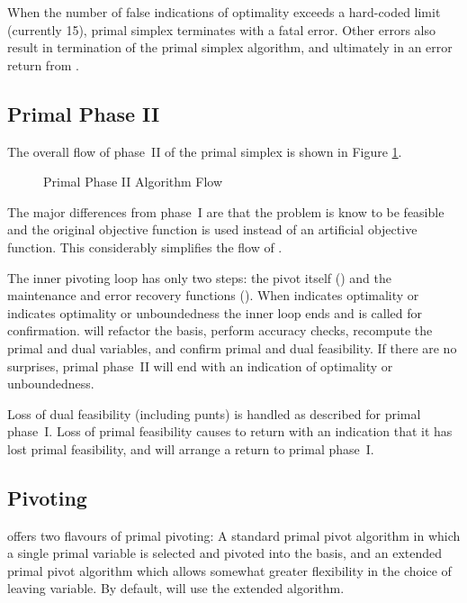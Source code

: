 When the number of false indications of optimality exceeds a hard-coded limit
(currently 15), primal simplex terminates with a fatal error.
Other errors also result in termination of the primal simplex algorithm, and
ultimately in an error return from \dylp.

\subsection{Primal Phase II}
\label{sec:PrimalPhaseII}

The overall flow of phase~II of the primal simplex is shown in Figure
\ref{fig:PrimalPhaseIIFlow}.
\begin{figure}[htbp]
\centering
{}
\caption{Primal Phase II Algorithm Flow} \label{fig:PrimalPhaseIIFlow}
\end{figure}
The major differences from phase~I are that the problem is know to be feasible
and the original objective function is used instead of an artificial
objective function.
This considerably simplifies the flow of .

The inner pivoting loop has only two steps: the pivot itself
() and the maintenance and error recovery functions
().
When  indicates optimality or
 indicates optimality or unboundedness
the inner loop ends and
 is called for confirmation.
 will refactor the basis, perform accuracy checks,
recompute the primal and dual variables, and confirm primal and dual
feasibility.
If there are no surprises, primal phase~II will end with an indication of
optimality or unboundedness.

Loss of dual feasibility (including punts) is handled as described for primal
phase~I.
Loss of primal feasibility causes  to return with an indication
that it has lost primal feasibility, and  will arrange a
return to primal phase~I\@.

\subsection{Pivoting}
\label{sec:PrimalPivoting}

\dylp offers two flavours of primal pivoting: A standard primal pivot
algorithm in which a single primal variable is selected and pivoted into
the basis, and an extended primal pivot algorithm which allows somewhat greater
flexibility in the choice of leaving variable.
By default, \dylp will use the extended algorithm.


